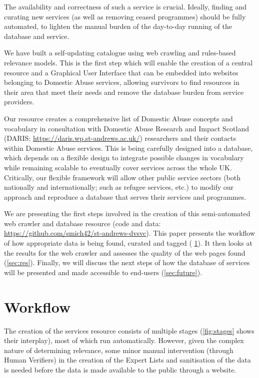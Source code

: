 \documentclass[conference]{IEEEtran}
\begin{document}
The availability and correctness of such a service is crucial. 
Ideally, finding and curating new services (as well as removing ceased programmes) should be fully automated, to  lighten the manual burden of the day-to-day running of the database and service.

We have built a self-updating catalogue using web crawling and rules-based relevance models.
This is the first step which will enable the creation of a central resource and a Graphical User Interface that can be embedded into websites belonging to Domestic Abuse services, allowing survivors to find resources in their area that meet their needs and remove the database burden from service providers. 

Our resource creates a comprehensive list of Domestic Abuse concepts and vocabulary in consultation with Domestic Abuse Research and Impact Scotland (DARIS: \url{https://daris.wp.st-andrews.ac.uk/}) researchers and their contacts within Domestic Abuse services. 
This is being carefully designed into a database, which depends on a flexible design to integrate possible changes in vocabulary while remaining scalable to eventually cover services across the whole UK. 
Critically, our flexible framework will allow other public service sectors (both nationally and internationally; such as refugee services, etc.) to modify our approach and reproduce a database that serves their services and programmes.

We are presenting the first steps involved in the creation of this semi-automated web crawler and database resource (code and data: \url{https://github.com/smich42/st-andrews-dvsvc}).
This paper presents the workflow of how appropriate data is being found, curated and tagged ( \cref{sec:flow}). 
It then looks at the results for the web crawler and assesses the quality of the web pages found (\cref{sec:res}).
Finally, we will discuss the next steps of how the database of services will be presented and made accessible to end-users  (\cref{sec:future}).





\section{Workflow}
\label{sec:flow}
The creation of the services resource consists of multiple stages (\cref{fig:stages} shows their interplay), most of which run automatically. However, given the complex nature of determining relevance, some minor manual intervention (through Human Verifiers) in the creation of the Expert Lists and sanitisation of the data is needed before the data is made available to the public through a website.
\end{document}
